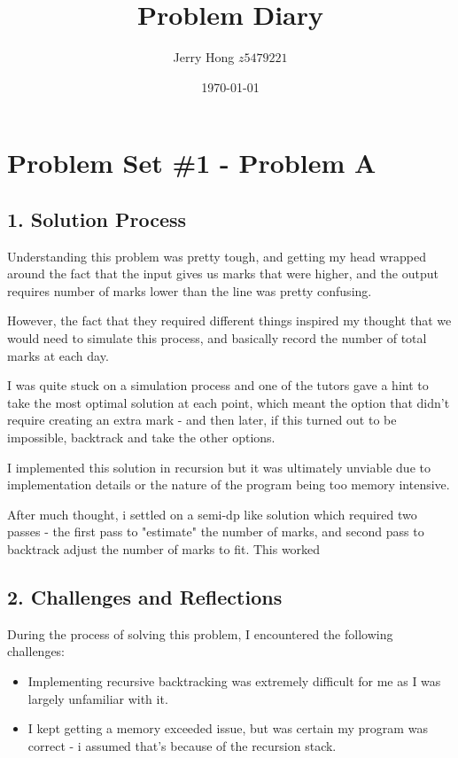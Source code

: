\documentclass[a4paper,12pt]{article}
\title{Problem Diary}
\author{Jerry Hong $z5479221$}
\date{\today}
\begin{document}
\maketitle

\section*{Problem Set \#1 - Problem A}

\subsection*{1. Solution Process}
Understanding this problem was pretty tough, and getting my head wrapped around the fact that the input gives us marks that were higher, and the output requires number of marks lower than the line was pretty confusing.

However, the fact that they required different things inspired my thought that we would need to simulate this process, and basically record the number of total marks at each day.

I was quite stuck on a simulation process and one of the tutors gave a hint to take the most optimal solution at each point, which meant the option that didn't require creating an extra mark - and then later, if this turned out to be impossible, backtrack and take the other options.

I implemented this solution in recursion but it was ultimately unviable due to implementation details or the nature of the program being too memory intensive.

After much thought, i settled on a semi-dp like solution which required two passes - the first pass to "estimate" the number of marks, and second pass to backtrack adjust the number of marks to fit. This worked

\subsection*{2. Challenges and Reflections}
During the process of solving this problem, I encountered the following challenges:
\begin{itemize}
    \item Implementing recursive backtracking was extremely difficult for me as I was largely unfamiliar with it. 
    \item I kept getting a memory exceeded issue, but was certain my program was correct - i assumed that's because of the recursion stack.
\end{itemize}
\end{document}
